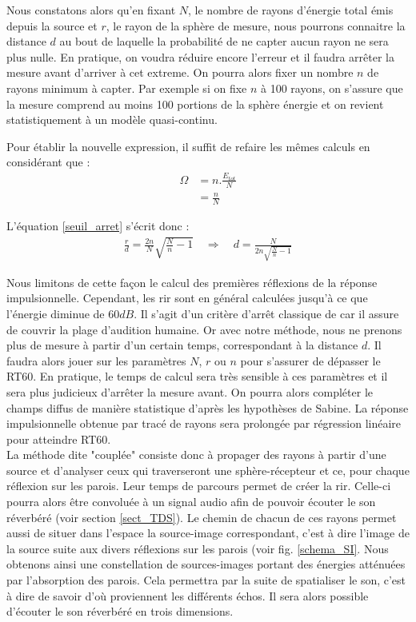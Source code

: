 Nous constatons alors qu'en fixant $N$, le nombre de rayons d'énergie total émis depuis la source et $r$, le rayon de la sphère de mesure, nous pourrons connaitre la distance $d$ au bout de laquelle la probabilité de ne capter aucun rayon ne sera plus nulle. En pratique, on voudra réduire encore l'erreur et il faudra arrêter la mesure avant d'arriver à cet extreme. On pourra alors fixer un nombre $n$ de rayons minimum à capter. Par exemple si on fixe $n$ à 100 rayons, on s'assure que la mesure comprend au moins 100 portions de la sphère énergie et on revient statistiquement à un modèle quasi-continu.

Pour établir la nouvelle expression, il suffit de refaire les mêmes calculs en considérant que :
\begin{align}
	\Omega &= n.\frac{E_{tot}}{N} \\
	&= \frac{n}{N}
\end{align}

L'équation \ref{seuil_arret} s'écrit donc :
\begin{align} 
	\frac{r}{d} =  \frac{2n}{N} \sqrt{\frac{N}{n}-1} %
 	\quad \Rightarrow  \quad %
	 d =  \frac{N}{2n\sqrt{\frac{N}{n}-1}} 
\end{align}

Nous limitons de cette façon le calcul des premières réflexions de la réponse impulsionnelle. Cependant, les \gls{rir} sont en général calculées jusqu'à ce que l'énergie diminue de $60dB$. Il s'agit d'un critère d'arrêt classique de car il assure de couvrir la plage d'audition humaine. Or avec notre méthode, nous ne prenons plus de mesure à partir d'un certain temps, correspondant à la distance $d$. Il faudra alors jouer sur les paramètres $N$, $r$ ou $n$ pour s'assurer de dépasser le \gls{RT60}. En pratique, le temps de calcul sera très sensible à ces paramètres et il sera plus judicieux d'arrêter la mesure avant. On pourra alors compléter le champs diffus de manière statistique d'après les hypothèses de Sabine. La réponse impulsionnelle obtenue par tracé de rayons sera prolongée par régression linéaire pour atteindre \gls{RT60}. \\


La méthode dite "couplée" consiste donc à propager des rayons à partir d'une source et d'analyser ceux qui traverseront une sphère-récepteur et ce, pour chaque réflexion sur les parois. Leur temps de parcours permet de créer la \gls{rir}. Celle-ci pourra alors être convoluée à un signal audio afin de pouvoir écouter le son réverbéré (voir section \ref{sect_TDS}). Le chemin de chacun de ces rayons permet aussi de situer dans l'espace la source-image correspondant, c'est à dire l'image de la source suite aux divers réflexions sur les parois (voir fig. \ref{schema_SI}. Nous obtenons ainsi une constellation de sources-images portant des énergies atténuées par l'absorption des parois. Cela permettra par la suite de spatialiser le son, c'est à dire de savoir d'où proviennent les différents échos. Il sera alors possible d'écouter le son réverbéré en trois dimensions.

